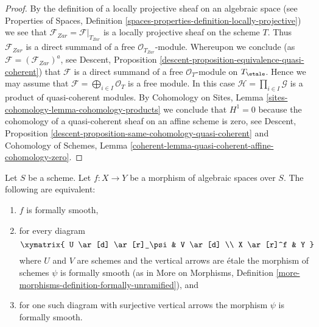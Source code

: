 \begin{proof}
By the definition of a locally projective sheaf on an algebraic space (see
Properties of Spaces,
Definition \ref{spaces-properties-definition-locally-projective})
we see that $\mathcal{F}_{Zar} = \mathcal{F}|_{T_{Zar}}$ is a locally
projective sheaf on the scheme $T$. Thus $\mathcal{F}_{Zar}$ is a
direct summand of a free $\mathcal{O}_{T_{Zar}}$-module. Whereupon
we conclude (as $\mathcal{F} = (\mathcal{F}_{Zar})^a$, see
Descent, Proposition \ref{descent-proposition-equivalence-quasi-coherent})
that $\mathcal{F}$ is a direct summand of a free $\mathcal{O}_T$-module
on $T_\etale$. Hence we may assume that
$\mathcal{F} = \bigoplus_{i \in I} \mathcal{O}_T$ is a free module.
In this case $\mathcal{H} = \prod_{i \in I} \mathcal{G}$ is
a product of quasi-coherent modules. By
Cohomology on Sites, Lemma \ref{sites-cohomology-lemma-cohomology-products}
we conclude that $H^1 = 0$ because the cohomology of a quasi-coherent sheaf
on an affine scheme is zero, see
Descent, Proposition \ref{descent-proposition-same-cohomology-quasi-coherent}
and Cohomology of Schemes, Lemma
\ref{coherent-lemma-quasi-coherent-affine-cohomology-zero}.
\end{proof}

\begin{lemma}
\label{lemma-formally-smooth}
Let $S$ be a scheme.
Let $f : X \to Y$ be a morphism of algebraic spaces over
$S$. The following are equivalent:
\begin{enumerate}
\item $f$ is formally smooth,
\item for every diagram
$$
\xymatrix{
U \ar[d] \ar[r]_\psi & V \ar[d] \\
X \ar[r]^f & Y
}
$$
where $U$ and $V$ are schemes and the vertical arrows are \'etale
the morphism of schemes $\psi$ is formally smooth (as in
More on Morphisms,
Definition \ref{more-morphisms-definition-formally-unramified}), and
\item for one such diagram with surjective vertical arrows the morphism
$\psi$ is formally smooth.
\end{enumerate}
\end{lemma}

